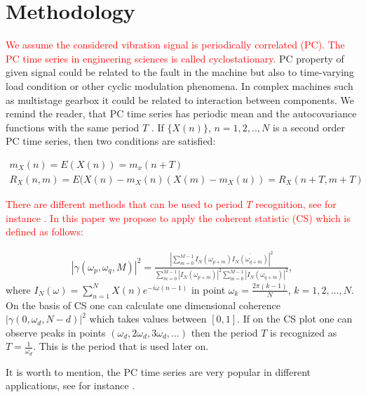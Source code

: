 \documentclass[preprint]{elsarticle}
\begin{document}
\section{Methodology}

\textcolor{red}{We assume the considered vibration signal is periodically correlated (PC). The PC time series in engineering sciences is called cyclostationary. }PC property of given signal could be related to the fault in the machine but also to time-varying load condition or other cyclic modulation phenomena. In complex machines such as multistage gearbox it could be related to interaction between components. We remind the reader, that PC time series has periodic mean and the autocovariance functions with the same period $T$ \cite{hurd2007periodically}. If $\{X(n)\}$, $n=1,2,..,N$ is a second order PC time series, then two conditions are satisfied:

\begin{equation}
\label{eq:PC.process}
\begin{gathered}
m_X(n)=E\left(X(n)\right)=m_x(n+T) \\
R_X(n,m)=E(X(n)-m_X(n)(X(m)-m_X(u))=R_X(n+T,m+T)
\end{gathered}
\end{equation}

\textcolor{red}{There are different methods that can be used to period $T$ recognition, see for instance \cite{antoni2004cyclostationary}. In this paper we propose to apply  the coherent statistic \cite{hurd2007periodically} (CS) which is defined as follows:}

\begin{equation}
\label{eq:coherence}
\begin{gathered}
|\gamma(\omega_p,\omega_q,M)|^2=\frac{|\sum_{m=0}^{M-1}I_N(\omega_{p+m})\overline{I_N(\omega_{q+m})} |^2}{\sum_{m=0}^{M-1}|I_N(\omega_{p+m})|^2\sum_{m=0}^{M-1}|I_N(\omega_{q+m})|^2},
\end{gathered}
\end{equation}
where $I_N(\omega)=\sum_{n=1}^{N}X(n)e^{-i \omega(n-1)}$ in point $\omega_k=\frac{2 \pi(k-1)}{N}$, $k=1,2,\dots,N$. On the basis of CS one can calculate one dimensional coherence $|\gamma(0,\omega_d,N-d)|^2$ which takes values between $[0,1]$. If on the CS plot one can observe peaks in points $(\omega_d,2\omega_d,3\omega_d,\dots)$ then the period $T$ is recognized as $T=\frac{1}{\omega_d}$. This is the period that is used later on. 

It is worth to mention, the PC time series are very popular in different applications, see for instance \cite{antoni2004cyclostationary,broszkiewicz2004detecting}.
\end{document}
